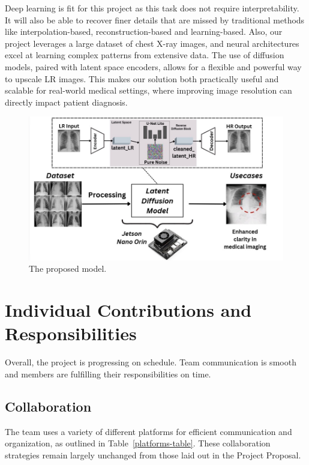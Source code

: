 \documentclass{article} %
\begin{document}
Deep learning is fit for this project as this task does not require interpretability. It will also be able to recover finer details that are missed by traditional methods like interpolation-based, reconstruction-based and learning-based. Also, our project leverages a large dataset of chest X-ray images, and neural architectures excel at learning complex patterns from extensive data. The use of diffusion models, paired with latent space encoders, allows for a flexible and powerful way to upscale LR images. This makes our solution both practically useful and scalable for real-world medical settings, where improving image resolution can directly impact patient diagnosis.

\begin{figure}[h]
\begin{center}
\includegraphics[width=1\textwidth]{Figs/modelmain.jpg}
\end{center}
\caption{The proposed model.}
\label{modelmain}
\end{figure}

\section{Individual Contributions and Responsibilities}

Overall, the project is progressing on schedule. Team communication is smooth and members are fulfilling their responsibilities on time.

\subsection{Collaboration}

The team uses a variety of different platforms for efficient communication and organization, as outlined in Table~\ref{platforms-table}. These collaboration strategies remain largely unchanged from those laid out in the Project Proposal.
\end{document}
